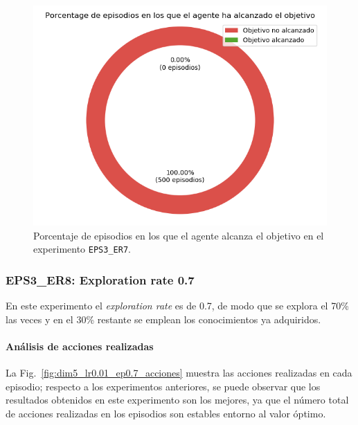 \begin{figure}
    \centering
    \includegraphics[scale=0.4]{cap5_experimentacion/images/dim5_lr0.01_ep0.6_porcentajeResuelto.png}
    \caption{Porcentaje de episodios en los que el agente alcanza el objetivo en el experimento \texttt{EPS3\_ER7}.}
    \label{fig:dim5_lr0.01_ep0.6_porcentajeResuelto}
\end{figure}

\subsubsection{EPS3\_ER8: Exploration rate 0.7} \label{EPS2_ER8}

En este experimento el \textit{exploration rate} es de 0.7, de modo que se explora el 70\% las veces y en el 30\% restante se emplean los conocimientos ya adquiridos. \\

\paragraph{Análisis de acciones realizadas}

La Fig.~\ref{fig:dim5_lr0.01_ep0.7_acciones} muestra las acciones realizadas en cada episodio; respecto a los experimentos anteriores, se puede observar que los resultados obtenidos en este experimento son los mejores, ya que el número total de acciones realizadas en los episodios son estables entorno al valor óptimo. \\

